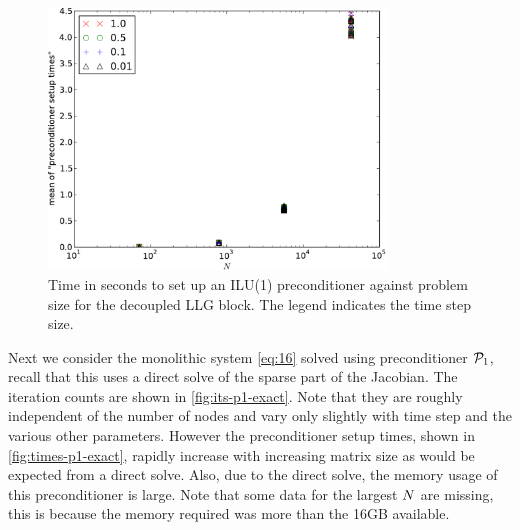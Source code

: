 \begin{figure}
  \centering
  \includegraphics[width=0.8\textwidth]{plots/linear_solvers/ilu-1decoupleddummy-meanofpreconditionersetuptimesvsinitialnnode.pdf}
  \caption{Time in seconds to set up an ILU(1) preconditioner against problem size for the decoupled LLG block. The legend indicates the time step size.}
  \label{fig:times-ilu-decoupled}
\end{figure}


Next we consider the monolithic system \cref{eq:16} solved using preconditioner $\mathcal{P}_1$, recall that this uses a direct solve of the sparse part of the Jacobian.
The iteration counts are shown in \cref{fig:its-p1-exact}.
Note that they are roughly independent of the number of nodes and vary only slightly with time step and the various other parameters.
However the preconditioner setup times, shown in \cref{fig:times-p1-exact}, rapidly increase with increasing matrix size as would be expected from a direct solve.
Also, due to the direct solve, the memory usage of this preconditioner is large.
Note that some data for the largest $N$ are missing, this is because the memory required was more than the 16GB available.

